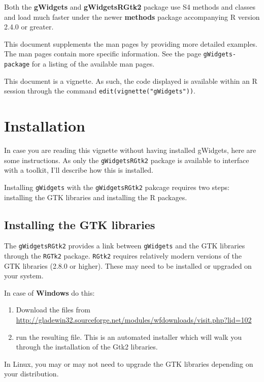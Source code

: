 \documentclass[12pt]{article}
\newcommand{\RCode}[1]{\texttt{#1}}
\newcommand{\RPackage}[1]{\textbf{#1}}
\begin{document}
Both the \RPackage{gWidgets} and \RPackage{gWidgetsRGtk2} package use
S4 methods and classes and load much faster under the newer
\RPackage{methods} package accompanying R version 2.4.0 or greater.

This document supplements the man pages by providing more detailed
examples. The man pages contain more specific information. See the 
page \RCode{gWidgets-package} for a listing of the available man pages.

This document is a vignette. As such, the code displayed is available
within an R session through the command
\RCode{edit(vignette("gWidgets"))}. 


\section{Installation}
In case you are reading this vignette without having installed
gWidgets, here are some instructions. As only the
\RCode{gWidgetsRGtk2} package is available to interface with a
toolkit, I'll describe how this is installed.

Installing \RCode{gWidgets} with the \RCode{gWidgetsRGtk2} pakcage
requires two steps: installing the GTK libraries and installing the R
packages.



\subsection{Installing the GTK libraries}

The \RCode{gWidgetsRGtk2} provides a link between \RCode{gWidgets} and
the GTK libraries through the \RCode{RGTk2} package.  \texttt{RGtk2}
requires relatively modern versions of the GTK libraries (2.8.0 or
higher). These may need to be installed or upgraded on your system.

In case of \textbf{Windows} do this:

\begin{enumerate}
\item 
 Download the files from
\href{http://gladewin32.sourceforge.net/modules/wfdownloads/visit.php?lid=102}{http://gladewin32.sourceforge.net/modules/wfdownloads/visit.php?lid=102}

\item run the resulting file.  This is an automated installer which will walk
you through the installation of the Gtk2 libraries.
\end{enumerate}

In Linux, you may or may not need to upgrade the GTK libraries
depending on your distribution.
\end{document}
